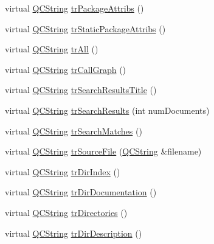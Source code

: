 \begin{DoxyCompactItemize}
\item 
virtual \mbox{\hyperlink{class_q_c_string}{Q\+C\+String}} \mbox{\hyperlink{class_translator_vietnamese_acbccbeae7500f1153d832267107be077}{tr\+Package\+Attribs}} ()
\item 
virtual \mbox{\hyperlink{class_q_c_string}{Q\+C\+String}} \mbox{\hyperlink{class_translator_vietnamese_a8c196e52cf85888a374c4cf1592cc0bb}{tr\+Static\+Package\+Attribs}} ()
\item 
virtual \mbox{\hyperlink{class_q_c_string}{Q\+C\+String}} \mbox{\hyperlink{class_translator_vietnamese_a08f55267e94ac509c8e73afa856ef8a9}{tr\+All}} ()
\item 
virtual \mbox{\hyperlink{class_q_c_string}{Q\+C\+String}} \mbox{\hyperlink{class_translator_vietnamese_a57072a7154758c0d2f21b2a24ad6d65e}{tr\+Call\+Graph}} ()
\item 
virtual \mbox{\hyperlink{class_q_c_string}{Q\+C\+String}} \mbox{\hyperlink{class_translator_vietnamese_af10f48afc231f87ca74a70c22cb80ee0}{tr\+Search\+Results\+Title}} ()
\item 
virtual \mbox{\hyperlink{class_q_c_string}{Q\+C\+String}} \mbox{\hyperlink{class_translator_vietnamese_ad09691682e602a30fcf0f7fa140bb20e}{tr\+Search\+Results}} (int num\+Documents)
\item 
virtual \mbox{\hyperlink{class_q_c_string}{Q\+C\+String}} \mbox{\hyperlink{class_translator_vietnamese_a38708ebc35882b46325bbee55065d2b6}{tr\+Search\+Matches}} ()
\item 
virtual \mbox{\hyperlink{class_q_c_string}{Q\+C\+String}} \mbox{\hyperlink{class_translator_vietnamese_a27928cfb9aa5bad7aa306cc0a2296d56}{tr\+Source\+File}} (\mbox{\hyperlink{class_q_c_string}{Q\+C\+String}} \&filename)
\item 
virtual \mbox{\hyperlink{class_q_c_string}{Q\+C\+String}} \mbox{\hyperlink{class_translator_vietnamese_aabe2a62caa6ae4bd026ea8ebf7b1408a}{tr\+Dir\+Index}} ()
\item 
virtual \mbox{\hyperlink{class_q_c_string}{Q\+C\+String}} \mbox{\hyperlink{class_translator_vietnamese_a482af304c4079f98fb1db63abc395737}{tr\+Dir\+Documentation}} ()
\item 
virtual \mbox{\hyperlink{class_q_c_string}{Q\+C\+String}} \mbox{\hyperlink{class_translator_vietnamese_a3f3915e52140601ac949071a43a0850f}{tr\+Directories}} ()
\item 
virtual \mbox{\hyperlink{class_q_c_string}{Q\+C\+String}} \mbox{\hyperlink{class_translator_vietnamese_a704e01af5383836a98fbe7ef27083114}{tr\+Dir\+Description}} ()
\item 

\end{DoxyCompactItemize}
